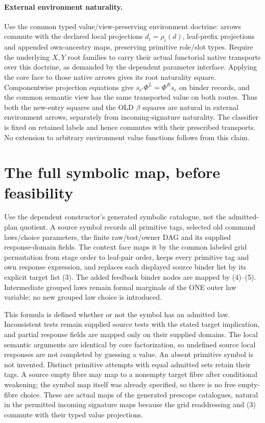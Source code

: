 \documentclass[11pt]{article}
\begin{document}
\paragraph{External environment naturality.}
Use the common typed value/view-preserving environment doctrine: arrows commute with the declared local projections $d_i=\rho_i(d)$, leaf-prefix projections and appended own-ancestry maps, preserving primitive role/slot types. Require the underlying $X,Y$ root families to carry their actual functorial native transports over this doctrine, as demanded by the dependent parameter interface. Applying the core face to those native arrows gives its root naturality square. Componentwise projection equations give $s_{e'}\Phi^L=\Phi^R s_e$ on binder records, and the common semantic view has the same transported value on both routes. Thus both the new-entry squares and the OLD $\beta$ squares are natural in external environment arrows, separately from incoming-signature naturality. The classifier is fixed on retained labels and hence commutes with their prescribed transports. No extension to arbitrary environment value functions follows from this claim.

\section{The full symbolic map, before feasibility}
Use the dependent constructor's generated symbolic catalogue, not the admitted-plan quotient. A source symbol records all primitive tags, selected old command laws/choice parameters, the finite raw/test/owner DAG and its supplied response-domain fields. The context face maps it by the common labeled grid permutation from stage order to leaf-pair order, keeps every primitive tag and own response expression, and replaces each displayed source binder list by its explicit target list (3). The added feedback binder nodes are mapped by (4)--(5). Intermediate grouped laws remain formal marginals of the ONE outer law variable; no new grouped law choice is introduced.

This formula is defined whether or not the symbol has an admitted law. Inconsistent tests remain supplied source tests with the stated target implication, and partial response fields are mapped only on their supplied domains. The local semantic arguments are identical by core factorization, so undefined source local responses are not completed by guessing a value. An absent primitive symbol is not invented. Distinct primitive attempts with equal admitted sets retain their tags. A source empty fibre may map to a nonempty target fibre after conditional weakening; the symbol map itself was already specified, so there is no free empty-fibre choice. These are actual maps of the generated prescope catalogues, natural in the permitted incoming signature maps because the grid readdressing and (3) commute with their typed value projections.
\end{document}
